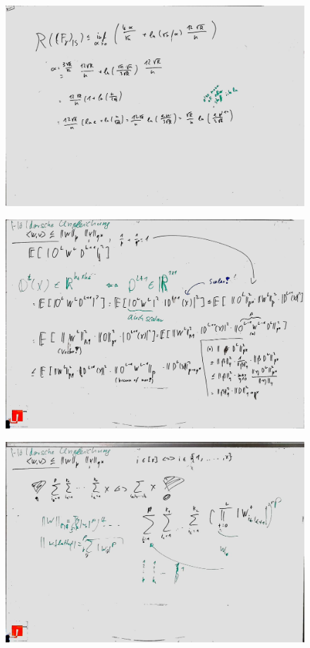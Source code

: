 \begin{figure}[htb]
	\centering
	\includegraphics[width=\textwidth]{whiteboard_notes/21.jpg}
\end{figure}


\begin{figure}[htb]
	\centering
	\includegraphics[width=\textwidth]{whiteboard_notes/22.jpg}
\end{figure}

\begin{figure}[htb]
	\centering
	\includegraphics[width=\textwidth]{whiteboard_notes/23.jpg}
\end{figure}


